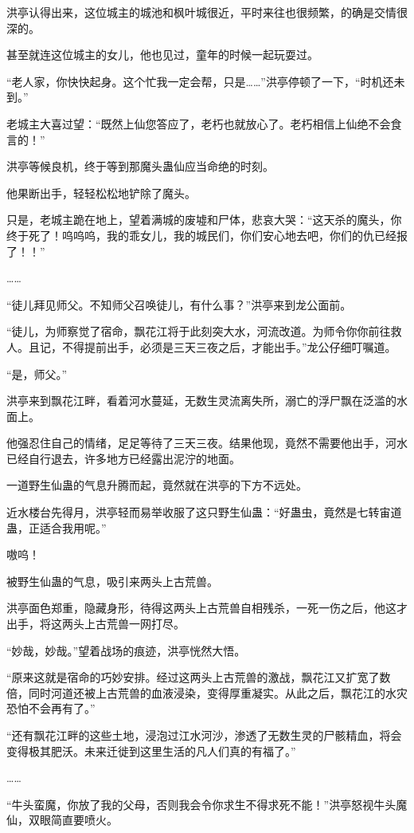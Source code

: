 \begin{this_body}
洪亭认得出来，这位城主的城池和枫叶城很近，平时来往也很频繁，的确是交情很深的。

甚至就连这位城主的女儿，他也见过，童年的时候一起玩耍过。

“老人家，你快快起身。这个忙我一定会帮，只是……”洪亭停顿了一下，“时机还未到。”

老城主大喜过望：“既然上仙您答应了，老朽也就放心了。老朽相信上仙绝不会食言的！”

洪亭等候良机，终于等到那魔头蛊仙应当命绝的时刻。

他果断出手，轻轻松松地铲除了魔头。

只是，老城主跪在地上，望着满城的废墟和尸体，悲哀大哭：“这天杀的魔头，你终于死了！呜呜呜，我的乖女儿，我的城民们，你们安心地去吧，你们的仇已经报了！！”

……

“徒儿拜见师父。不知师父召唤徒儿，有什么事？”洪亭来到龙公面前。

“徒儿，为师察觉了宿命，飘花江将于此刻突大水，河流改道。为师令你你前往救人。且记，不得提前出手，必须是三天三夜之后，才能出手。”龙公仔细叮嘱道。

“是，师父。”

洪亭来到飘花江畔，看着河水蔓延，无数生灵流离失所，溺亡的浮尸飘在泛滥的水面上。

他强忍住自己的情绪，足足等待了三天三夜。结果他现，竟然不需要他出手，河水已经自行退去，许多地方已经露出泥泞的地面。

一道野生仙蛊的气息升腾而起，竟然就在洪亭的下方不远处。

近水楼台先得月，洪亭轻而易举收服了这只野生仙蛊：“好蛊虫，竟然是七转宙道蛊，正适合我用呢。”

嗷呜！

被野生仙蛊的气息，吸引来两头上古荒兽。

洪亭面色郑重，隐藏身形，待得这两头上古荒兽自相残杀，一死一伤之后，他这才出手，将这两头上古荒兽一网打尽。

“妙哉，妙哉。”望着战场的痕迹，洪亭恍然大悟。

“原来这就是宿命的巧妙安排。经过这两头上古荒兽的激战，飘花江又扩宽了数倍，同时河道还被上古荒兽的血液浸染，变得厚重凝实。从此之后，飘花江的水灾恐怕不会再有了。”

“还有飘花江畔的这些土地，浸泡过江水河沙，渗透了无数生灵的尸骸精血，将会变得极其肥沃。未来迁徙到这里生活的凡人们真的有福了。”

……

“牛头蛮魔，你放了我的父母，否则我会令你求生不得求死不能！”洪亭怒视牛头魔仙，双眼简直要喷火。


\end{this_body}

